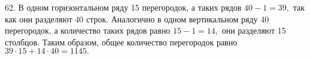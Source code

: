 62. В одном горизонтальном ряду 15 перегородок, а таких рядов $40-1=39,$ так как они разделяют 40 строк. Аналогично в одном вертикальном ряду 40 перегородок, а количество таких рядов равно $15-1=14,$ они разделяют 15 столбцов. Таким образом, общее количество перегородок равно $39\cdot15+14\cdot40=1145.$\\
